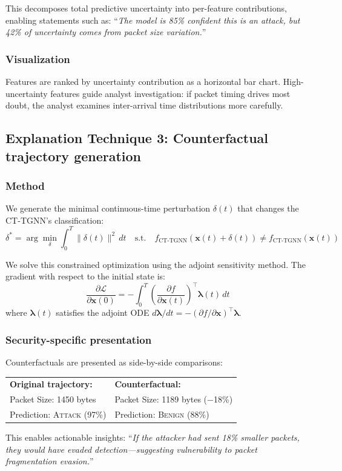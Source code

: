 \documentclass[preprint,review,12pt]{elsarticle}
\newcommand{\calL}{\mathcal{L}}
\begin{document}
This decomposes total predictive uncertainty into per-feature contributions, enabling statements such as: ``\textit{The model is 85\% confident this is an attack, but 42\% of uncertainty comes from packet size variation.}''

\subsubsection{Visualization}
Features are ranked by uncertainty contribution as a horizontal bar chart. High-uncertainty features guide analyst investigation: if packet timing drives most doubt, the analyst examines inter-arrival time distributions more carefully.

\subsection{Explanation Technique 3: Counterfactual trajectory generation}

\subsubsection{Method}
We generate the minimal continuous-time perturbation $\delta(t)$ that changes the CT-TGNN's classification:
\begin{equation}\label{eq:counterfactual}
    \delta^* = \arg\min_{\delta} \int_0^T \|\delta(t)\|^2 \, dt \quad \text{s.t.} \quad f_{\text{CT-TGNN}}(\mathbf{x}(t) + \delta(t)) \neq f_{\text{CT-TGNN}}(\mathbf{x}(t))
\end{equation}

We solve this constrained optimization using the adjoint sensitivity method. The gradient with respect to the initial state is:
\begin{equation}
    \frac{\partial \calL}{\partial \mathbf{x}(0)} = -\int_0^T \left(\frac{\partial f}{\partial \mathbf{x}(t)}\right)^{\!\top} \boldsymbol{\lambda}(t) \, dt
\end{equation}
where $\boldsymbol{\lambda}(t)$ satisfies the adjoint ODE $d\boldsymbol{\lambda}/dt = -(\partial f / \partial \mathbf{x})^\top \boldsymbol{\lambda}$.

\subsubsection{Security-specific presentation}
Counterfactuals are presented as side-by-side comparisons:
\begin{center}
\begin{tabular}{@{}ll@{}}
\textbf{Original trajectory:} & \textbf{Counterfactual:} \\
Packet Size: 1450 bytes & Packet Size: 1189 bytes ($-$18\%) \\
Prediction: \textsc{Attack} (97\%) & Prediction: \textsc{Benign} (88\%) \\
\end{tabular}
\end{center}
This enables actionable insights: ``\textit{If the attacker had sent 18\% smaller packets, they would have evaded detection---suggesting vulnerability to packet fragmentation evasion.}''
\end{document}
